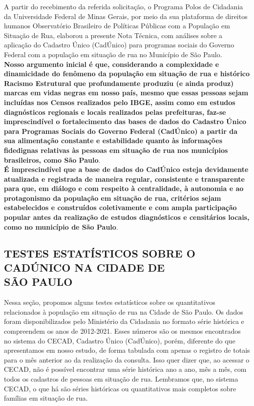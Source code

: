 \documentclass[14pt]{extarticle}
\begin{document}
A partir do recebimento da referida solicitação, o Programa Polos de Cidadania da Universidade Federal de Minas Gerais, por meio da sua plataforma de direitos humanos Observatório Brasileiro de Políticas Públicas com a População em Situação de Rua, elaborou a presente Nota Técnica, com análises sobre a aplicação do Cadastro Único (CadÚnico) para programas sociais do Governo Federal com a população em situação de rua no Município de São Paulo.\\

\textbf{Nosso argumento inicial é que, considerando a complexidade e dinamicidade do fenômeno da população em situação de rua e histórico Racismo Estrutural que profundamente produziu (e ainda produz) marcas em vidas negras em nosso país, mesmo que essas pessoas sejam incluídas nos Censos realizados pelo IBGE, assim como em estudos diagnósticos regionais e locais realizados pelas prefeituras, faz-se imprescindível o fortalecimento das bases de dados do Cadastro Único para Programas Sociais do Governo Federal (CadÚnico) a partir da sua alimentação constante e estabilidade quanto às informações fidedignas relativas às pessoas em situação de rua nos municípios brasileiros, como São Paulo}.\\

\textbf{É imprescindível que a base de dados do CadÚnico esteja devidamente atualizada e registrada de maneira regular, consistente e transparente para que, em diálogo e com respeito à centralidade, à autonomia e ao protagonismo da população em situação de rua, critérios sejam estabelecidos e construídos coletivamente e com ampla participação popular antes da realização de estudos diagnósticos e censitários locais, como no município de São Paulo}.\\


\newpage



\begin{center}
\section{TESTES ESTATÍSTICOS SOBRE O CADÚNICO NA CIDADE DE\\ SÃO PAULO}
\end{center}
\label{parte_2}
\vspace{1cm}

Nessa seção, propomos alguns testes estatísticos sobre os quantitativos relacionados à população em situação de rua na Cidade de São Paulo. Os dados foram disponibilizados pelo Ministério da Cidadania no formato série histórica e compreendem os anos de 2012-2021. Esses números são os mesmos encontrados no sistema do CECAD, Cadastro Único (CadÚnico), porém, diferente do que apresentamos em nosso estudo, de forma tabulada com apenas o registro de totais para o mês anterior ao da realização da consulta. Isso quer dizer que, ao acessar o CECAD, não é possível encontrar uma série histórica ano a ano, mês a mês, com todos os cadastros de pessoas em situação de rua. Lembramos que, no sistema CECAD, o que há são séries históricas ou quantitativos mais completos sobre famílias em situação de rua.\\ 
\end{document}

